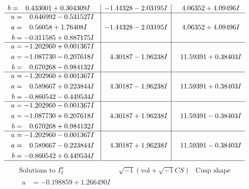 \documentclass[1p]{elsarticle_modified}
\theoremstyle{definition}
\newcommand{\I}{\sqrt{-1}}
\begin{document}
$$\begin{array}{c|c|c}
\begin{aligned}
b &= \phantom{-}0.433001 + 0.304309 I\end{aligned}
 & -1.44328 - 2.03195 I & \phantom{-}4.06352 + 4.09496 I \\ \hline\begin{aligned}
u &= \phantom{-}0.646992 - 0.531527 I \\
a &= \phantom{-}0.56058 + 1.76408 I \\
b &= -0.311585 + 0.887175 I\end{aligned}
 & -1.44328 - 2.03195 I & \phantom{-}4.06352 + 4.09496 I \\ \hline\begin{aligned}
u &= -1.202960 + 0.001367 I \\
a &= -1.087730 - 0.207618 I \\
b &= \phantom{-}0.670268 - 0.984132 I\end{aligned}
 & \phantom{-}4.30187 - 1.96238 I & \phantom{-}11.59391 + 0.38403 I \\ \hline\begin{aligned}
u &= -1.202960 + 0.001367 I \\
a &= \phantom{-}0.589667 + 0.223844 I \\
b &= -0.860542 - 0.449534 I\end{aligned}
 & \phantom{-}4.30187 - 1.96238 I & \phantom{-}11.59391 + 0.38403 I \\ \hline\begin{aligned}
u &= -1.202960 - 0.001367 I \\
a &= -1.087730 + 0.207618 I \\
b &= \phantom{-}0.670268 + 0.984132 I\end{aligned}
 & \phantom{-}4.30187 + 1.96238 I & \phantom{-}11.59391 - 0.38403 I \\ \hline\begin{aligned}
u &= -1.202960 - 0.001367 I \\
a &= \phantom{-}0.589667 - 0.223844 I \\
b &= -0.860542 + 0.449534 I\end{aligned}
 & \phantom{-}4.30187 + 1.96238 I & \phantom{-}11.59391 - 0.38403 I\\
 \hline 
 \end{array}$$\newpage$$\begin{array}{c|c|c}  
\text{Solutions to }I^u_{2}& \I (\text{vol} + \sqrt{-1}CS) & \text{Cusp shape}\\
 \hline 
\begin{aligned}
u &= -0.198859 + 1.266490 I \\

\end{aligned}
\end{array}$$
\end{document}
